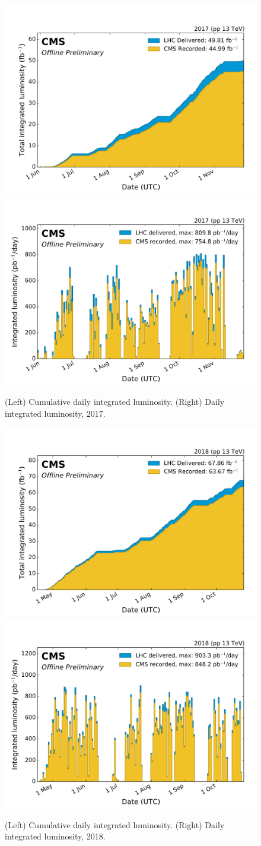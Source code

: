 \begin{figure}[h!]
    \centering
    \includegraphics[width=.45\textwidth]{Chapter3/Luminosity/int_lumi_per_day_cumulative_pp_2017_Normtag.pdf}
    \includegraphics[width=.45\textwidth]{Chapter3/Luminosity/int_lumi_per_day_pp_2017_Normtag.pdf}
    \caption[Cumulative day-by-day integrated luminosity in 2017]{(Left) Cumulative daily integrated luminosity. (Right) Daily integrated luminosity, 2017.}
    \label{Lumi_2017}
\end{figure}

\begin{figure}[h!]
    \centering
    \includegraphics[width=.45\textwidth]{Chapter3/Luminosity/int_lumi_per_day_cumulative_pp_2018_Normtag.pdf}
    \includegraphics[width=.45\textwidth]{Chapter3/Luminosity/int_lumi_per_day_pp_2018_Normtag.pdf}
    \caption[Cumulative day-by-day integrated luminosity in 2018]{(Left) Cumulative daily integrated luminosity. (Right) Daily integrated luminosity, 2018.}
    \label{Lumi_2018}
\end{figure}

